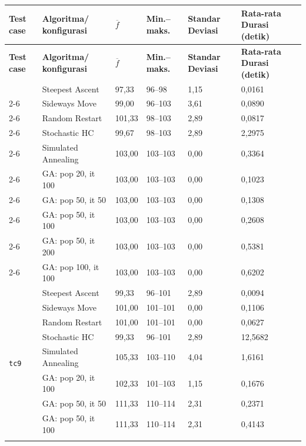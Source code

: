 \begin{longtable}{|p{1.5cm}|p{3.2cm}|p{1.1cm}|p{1.8cm}|p{1.9cm}|p{2.3cm}|}
\hline
\textbf{Test case} & \textbf{Algoritma/} \textbf{konfigurasi} & \textbf{$\overline{f}$} & \textbf{Min.--maks.} & \textbf{Standar Deviasi} & \textbf{Rata-rata Durasi (detik)} \\ \hline
\endfirsthead
\hline
\textbf{Test case} & \textbf{Algoritma/} \textbf{konfigurasi} & \textbf{$\overline{f}$} & \textbf{Min.--maks.} & \textbf{Standar Deviasi} & \textbf{Rata-rata Durasi (detik)} \\ \hline
\endhead
\hline
\endfoot
\endlastfoot
\multirow{10}{*}{\texttt{tc8}} & Steepest Ascent & 97,33 & 96--98 & 1,15 & 0,0161 \\ \cline{2-6}
 & Sideways Move & 99,00 & 96--103 & 3,61 & 0,0890 \\ \cline{2-6}
 & Random Restart & 101,33 & 98--103 & 2,89 & 0,0817 \\ \cline{2-6}
 & Stochastic HC & 99,67 & 98--103 & 2,89 & 2,2975 \\ \cline{2-6}
 & Simulated Annealing & 103,00 & 103--103 & 0,00 & 0,3364 \\ \cline{2-6}
 & GA: pop 20, it 100 & 103,00 & 103--103 & 0,00 & 0,1023 \\ \cline{2-6}
 & GA: pop 50, it 50 & 103,00 & 103--103 & 0,00 & 0,1308 \\ \cline{2-6}
 & GA: pop 50, it 100 & 103,00 & 103--103 & 0,00 & 0,2608 \\ \cline{2-6}
 & GA: pop 50, it 200 & 103,00 & 103--103 & 0,00 & 0,5381 \\ \cline{2-6}
 & GA: pop 100, it 100 & 103,00 & 103--103 & 0,00 & 0,6202 \\ \hline
\multirow{10}{*}{\texttt{tc9}} & Steepest Ascent & 99,33 & 96--101 & 2,89 & 0,0094 \\ \cline{2-6}
 & Sideways Move & 101,00 & 101--101 & 0,00 & 0,1106 \\ \cline{2-6}
 & Random Restart & 101,00 & 101--101 & 0,00 & 0,0627 \\ \cline{2-6}
 & Stochastic HC & 99,33 & 96--101 & 2,89 & 12,5682 \\ \cline{2-6}
 & Simulated Annealing & 105,33 & 103--110 & 4,04 & 1,6161 \\ \cline{2-6}
 & GA: pop 20, it 100 & 102,33 & 101--103 & 1,15 & 0,1676 \\ \cline{2-6}
 & GA: pop 50, it 50 & 111,33 & 110--114 & 2,31 & 0,2371 \\ \cline{2-6}
 & GA: pop 50, it 100 & 111,33 & 110--114 & 2,31 & 0,4143 \\ \cline{2-6}

\end{longtable}
